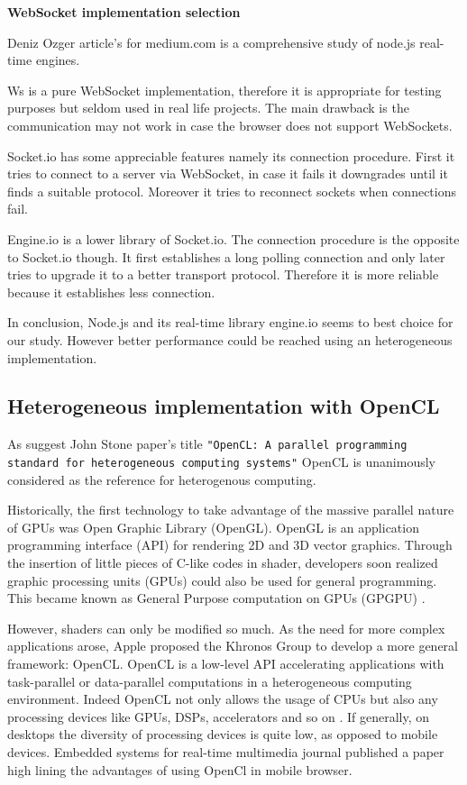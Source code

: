 \textbf{WebSocket implementation selection}

Deniz Ozger article's for medium.com \citep{Reference36} is a comprehensive study
of node.js real-time engines.

Ws is a pure WebSocket implementation, therefore it is appropriate for testing
purposes but seldom used in real life projects.  The main drawback is the
communication may not work in case the browser does not support WebSockets.

Socket.io has some appreciable features namely its connection procedure. First
it tries to connect to a server via WebSocket, in case it fails it downgrades
until it finds a suitable protocol. Moreover it tries to reconnect sockets
when connections fail. 

Engine.io is a lower library of Socket.io. The connection procedure is the
opposite to Socket.io though. It first establishes a long polling connection
and only later tries to upgrade it to a better transport protocol. Therefore it
is more reliable because it establishes less connection.

In conclusion, Node.js and its real-time library engine.io seems to best choice
for our study. However better performance could be reached using an
heterogeneous implementation.


\subsection{Heterogeneous implementation with OpenCL}

As suggest John Stone paper's title \texttt{"OpenCL: A parallel programming standard
for heterogeneous computing systems"} \citep{Reference5} OpenCL is unanimously
considered as the reference for heterogenous computing.

Historically, the first technology to take advantage of the massive parallel
nature of GPUs was Open Graphic Library (OpenGL). OpenGL is an application
programming interface (API) for rendering 2D and 3D vector graphics. Through
the insertion of little pieces of C-like codes in shader, developers soon
realized graphic processing units (GPUs) could also be used for general
programming. This became known as General Purpose computation on GPUs (GPGPU)
\citep{Reference5}.

However, shaders can only be modified so much. As the need for more complex
applications arose, Apple proposed the Khronos Group to develop a more general
framework: OpenCL. OpenCL is a low-level API accelerating applications with
task-parallel or data-parallel computations in a heterogeneous computing
environment. Indeed OpenCL not only allows the usage of CPUs but also any
processing devices like GPUs, DSPs, accelerators and so on \citep{Reference5}.
If generally, on desktops the diversity of processing devices is quite low, as
opposed to mobile devices. Embedded systems for real-time multimedia journal
published a paper \citep{Reference3} high lining the advantages of using OpenCl
in mobile browser.


